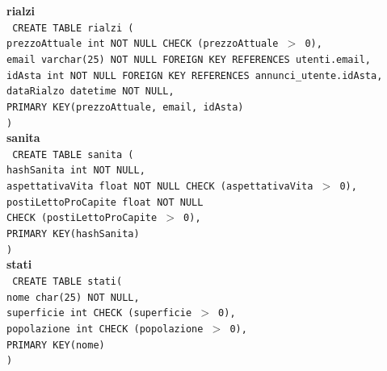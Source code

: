 \documentclass[a4paper,12pt]{report}
\begin{document}
                \noindent
                {\large \textbf{rialzi}} \\
                \texttt{
                    CREATE TABLE rialzi ( \\
                    \null\quad\quad prezzoAttuale   int         NOT NULL CHECK (prezzoAttuale $>$ 0), \\
                    \null\quad\quad email          varchar(25)     NOT NULL FOREIGN KEY REFERENCES utenti.email, \\
                    \null\quad\quad idAsta      int         NOT NULL FOREIGN KEY REFERENCES annunci\_utente.idAsta, \\
                    \null\quad\quad dataRialzo      datetime    NOT NULL, \\
                    \null\quad\quad PRIMARY KEY(prezzoAttuale, email, idAsta) \\
                    )
                } \\

                \noindent
                {\large \textbf{sanita}} \\
                \texttt{
                    CREATE TABLE sanita ( \\
                    \null\quad\quad hashSanita int NOT NULL, \\
                    \null\quad\quad aspettativaVita     float   NOT NULL CHECK (aspettativaVita $>$ 0), \\
                    \null\quad\quad postiLettoProCapite   float   NOT NULL \\
                            \null\qquad\qquad CHECK (postiLettoProCapite $>$ 0), \\
                    \null\quad\quad PRIMARY KEY(hashSanita) \\
                    )
                } \\

                \noindent
                {\large \textbf{stati}} \\
                \texttt{
                    CREATE TABLE stati( \\
                    \null\quad\quad nome            char(25)        NOT NULL, \\
                    \null\quad\quad superficie      int             CHECK (superficie $>$ 0), \\
                    \null\quad\quad popolazione     int             CHECK (popolazione $>$ 0), \\
                    \null\quad\quad PRIMARY KEY(nome) \\
                    )   
                } \\
\end{document}
